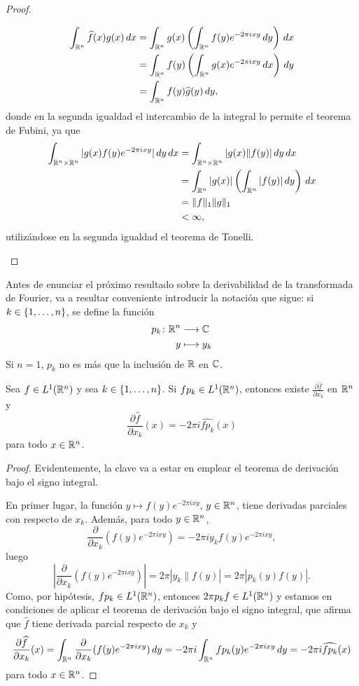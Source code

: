 \documentclass[a4paper, 11pt, oneside]{report}
\begin{document}
\begin{proof}
\begin{enumerate}
\[\begin{aligned}[t]
    \int_{\mathbb R^n} \widehat{f}(x)g(x) \, dx &= \int_{\mathbb R^n} g(x) \left(\int_{\mathbb R^n} f(y)e^{-2\pi i xy} \, dy\right) \, dx \\
    &= \int_{\mathbb R^n}f(y) \left( \int_{\mathbb R^n} g(x)e^{-2\pi i xy} \, dx\right) \, dy \\
    &= \int_{\mathbb R^n}f(y) \widehat{g}(y) \, dy,
    \end{aligned}
    \]
    donde en la segunda igualdad el intercambio de la integral lo permite el teorema de Fubini, ya que
    \[\begin{aligned}[t]
      \int_{\mathbb R^n \times \mathbb R^n} |g(x)f(y)e^{-2\pi i xy}| \, dy \, dx &= \int_{\mathbb R^n \times \mathbb R^n} |g(x)\|f(y)| \, dy \, dx \\
      &= \int_{\mathbb R^n} |g(x)| \left(\int_{\mathbb R^n} |f(y)| \, dy\right) \, dx \\
      &= \|f\|_1\|g\|_1 \\
      &< \infty,
    \end{aligned}\]
    utilizándose en la segunda igualdad el teorema de Tonelli. \qedhere
  \end{enumerate}
\end{proof}

Antes de enunciar el próximo resultado sobre la derivabilidad de la transformada de Fourier, va a resultar conveniente introducir la notación que sigue: si $k \in \{1,\mathellipsis,n\}$, se define la función
\begin{align*}
  p_k \colon \mathbb R^n &\longrightarrow \mathbb C \\
  y &\longmapsto y_k
\end{align*}
Si $n = 1$, $p_k$ no es más que la inclusión de $\mathbb R$ en $\mathbb C$.

\begin{theorem}\label{teo:3.1.6}
  Sea $f \in L^1(\mathbb R^n)$ y sea $k \in \{1,\mathellipsis,n\}$. Si $fp_k \in L^1(\mathbb R^n)$, entonces existe $\frac{\partial \widehat{f}}{\partial x_k}$ en $\mathbb R^n$ y
  \[\frac{\partial \widehat{f}}{\partial x_k}(x) = -2\pi i \widehat{fp_k}(x)\]
  para todo $x \in \mathbb R^n$.
\end{theorem}

\begin{proof}
  Evidentemente, la clave va a estar en emplear el teorema de derivación bajo el signo integral. 
  
  En primer lugar, la función $y \mapsto f(y)e^{-2\pi i xy}$, $y \in \mathbb R^n$, tiene derivadas parciales con respecto de $x_k$. Además, para todo $y \in \mathbb R^n$,
  \[\frac{\partial }{\partial x_k}(f(y)e^{-2\pi i xy}) = -2\pi i y_kf(y)e^{-2\pi i xy},\]
  luego
  \[\left|\frac{\partial }{\partial x_k}(f(y)e^{-2\pi i xy})\right| = 2 \pi |y_k\|f(y)| = 2\pi |p_k(y)f(y)|.\]
  Como, por hipótesis, $fp_k \in L^1(\mathbb R^n)$, entonces $2\pi p_kf \in L^1(\mathbb R^n)$ y estamos en condiciones de aplicar el teorema de derivación bajo el signo integral, que afirma que $\widehat{f}$ tiene derivada parcial respecto de $x_k$ y
  \[\frac{\partial \widehat{f}}{\partial x_k}(x) = \int_{\mathbb R^n}\frac{\partial }{\partial x_k}(f(y)e^{-2\pi i xy}) \, dy = -2\pi i \int_{\mathbb R^n} fp_k(y)e^{-2\pi i xy} \, dy = -2\pi i \widehat{fp_k}(x)\]
  para todo $x \in \mathbb R^n$.
\end{proof}
\end{document}

